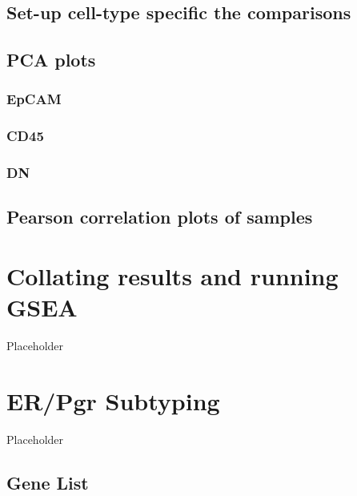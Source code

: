 \documentclass[
]{book}
\begin{document}
\hypertarget{set-up-cell-type-specific-the-comparisons}{%
\section{Set-up cell-type specific the comparisons}\label{set-up-cell-type-specific-the-comparisons}}

\hypertarget{pca-plots-1}{%
\section{PCA plots}\label{pca-plots-1}}

\hypertarget{epcam}{%
\subsection{EpCAM}\label{epcam}}

\hypertarget{cd45}{%
\subsection{CD45}\label{cd45}}

\hypertarget{dn}{%
\subsection{DN}\label{dn}}

\hypertarget{pearson-correlation-plots-of-samples}{%
\section{Pearson correlation plots of samples}\label{pearson-correlation-plots-of-samples}}

\hypertarget{collating-results-and-running-gsea}{%
\chapter{Collating results and running GSEA}\label{collating-results-and-running-gsea}}

Placeholder

\hypertarget{erpgr-subtyping}{%
\chapter{ER/Pgr Subtyping}\label{erpgr-subtyping}}

Placeholder

\hypertarget{gene-list}{%
\section{Gene List}\label{gene-list}}
\end{document}
